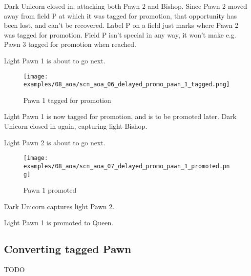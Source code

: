 Dark Unicorn closed in, attacking both Pawn 2 and Bishop. Since Pawn 2 moved
away from field P at which it was tagged for promotion, that opportunity has
been lost, and can't be recovered. Label P on a field just marks where Pawn 2
was tagged for promotion. Field P isn't special in any way, it won't make e.g.
Pawn 3 tagged for promotion when reached.

Light Pawn 1 is about to go next.

\clearpage %

\noindent
\begin{figure}[h]
\texttt{[image: examples/08\_aoa/scn\_aoa\_06\_delayed\_promo\_pawn\_1\_tagged.png]}
\caption{Pawn 1 tagged for promotion}
\label{fig:scn_aoa_06_delayed_promo_pawn_1_tagged}
\end{figure}

Light Pawn 1 is now tagged for promotion, and is to be promoted later.
Dark Unicorn closed in again, capturing light Bishop.

Light Pawn 2 is about to go next.

\clearpage %

\noindent
\begin{figure}[h]
\texttt{[image: examples/08\_aoa/scn\_aoa\_07\_delayed\_promo\_pawn\_1\_promoted.png]}
\caption{Pawn 1 promoted}
\label{fig:scn_aoa_07_delayed_promo_pawn_1_promoted}
\end{figure}

Dark Unicorn captures light Pawn 2.

Light Pawn 1 is promoted to Queen.

\clearpage %

\subsection*{Converting tagged Pawn}
\label{sec:Age of Aquarius/Promotion/Converting tagged Pawn}

\huge{TODO}
\normalsize{}

\clearpage %

